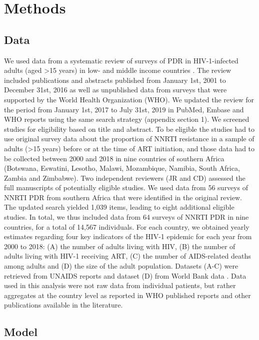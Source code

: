 \documentclass{article}
\begin{document}
\section{Methods}

\subsection{Data}

We used data from a systematic review of surveys of PDR in HIV-1-infected adults (aged >15 years) in low- and middle income countries \cite{gupta2018hiv}.
The review included publications and abstracts published from January 1st, 2001 to December 31st, 2016 as well as unpublished data from surveys that were supported by the World Health Organization (WHO). We updated the review for the period from January 1st, 2017 to July 31st, 2019 in PubMed, Embase and WHO reports using the same search strategy (appendix section 1). We screened studies for eligibility based on title and abstract. To be eligible the studies had to use original survey data about the proportion of NNRTI resistance in a sample of adults (>15 years) before or at the time of ART initiation, and those data had to be collected between 2000 and 2018 in nine countries of southern Africa (Botswana, Eswatini, Lesotho, Malawi, Mozambique, Namibia, South Africa, Zambia and Zimbabwe). Two independent reviewers (JR and CD) assessed the full manuscripts of potentially eligible studies. 
We used data from 56 surveys of NNRTI PDR from southern Africa that were identified in the original review. The updated search yielded 1,039 items, leading to eight additional eligible studies. In total, we thus included data from 64 surveys of NNRTI PDR in nine countries, for a total of 14,567 individuals. For each country, we obtained yearly estimates regarding four key indicators of the HIV-1 epidemic for each year from 2000 to 2018: (A) the number of adults living with HIV, (B) the number of adults living with HIV-1 receiving ART, (C) the number of AIDS-related deaths among adults and (D) the size of the adult population. Datasets (A-C) were retrieved from UNAIDS reports and dataset (D) from World Bank data \cite{unaidsreport2019,worldbank}.
Data used in this analysis were not raw data from individual patients, but rather aggregates at the country level as reported in WHO published reports and other publications available in the literature.

\subsection{Model}
\end{document}
